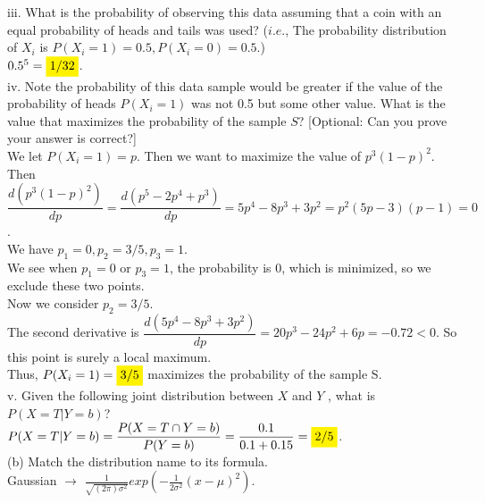 \documentclass[12pt]{article}
\begin{document}
iii. What is the probability of observing this data assuming that a coin with an equal probability of heads and tails was used? ($i.e.$, The probability distribution of $X_i$ is $P(X_i =1) = 0.5, P(X_i = 0) = 0.5$.)\\

$0.5^5 = \colorbox{yellow}{1/32}$.\\

iv. Note the probability of this data sample would be greater if the value of the probability of heads $P (X_i = 1)$ was not 0.5 but some other value. What is the value that maximizes the probability of the sample $S$? [Optional: Can you prove your answer is correct?]\\

We let $P(X_i = 1) = p$. Then we want to maximize the value of $p^3(1-p)^2$.\\

Then $\dfrac{d(p^3(1-p)^2)}{dp} = \dfrac{d(p^5 - 2p^4 + p^3)}{dp} = 5p^4 - 8 p^3 + 3 p^2 = p^2(5p-3)(p-1) = 0$.\\

We have $p_1 = 0, p_2 = 3/5, p_3 = 1$.\\

We see when $p_1 = 0$ or $p_3 = 1$, the probability is 0, which is minimized, so we exclude these two points.\\

Now we consider $p_2 = 3/5$.\\

The second derivative is $\dfrac{d(5p^4 - 8 p^3 + 3 p^2)}{dp} = 20p^3 - 24p^2 + 6p = -0.72 < 0$. So this point is surely a local maximum.\\

Thus, $P(X_i = 1) = \colorbox{yellow}{$3/5$}$ maximizes the probability of the sample S.\\

v. Given the following joint distribution between $X$ and $Y$ , what is $P (X = T |Y = b)$?\\

$P (X = T |Y = b) = \dfrac{P(X=T \cap Y=b)}{P(Y = b)} = \dfrac{0.1}{0.1 + 0.15} = \colorbox{yellow}{$2/5$}$.\\


\noindent(b) Match the distribution name to its formula.\\

Gaussian $\rightarrow$ $\frac{1}{\sqrt{(2\pi)\sigma^2}}exp(-\frac{1}{2\sigma^2}(x-\mu)^2)$.\\
\end{document}
